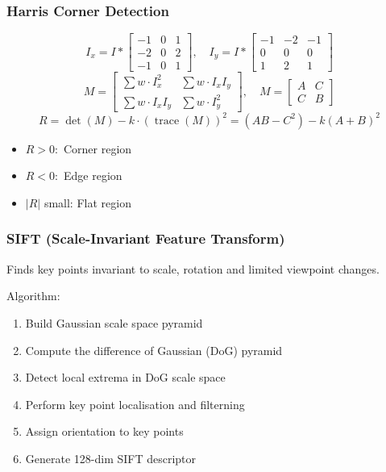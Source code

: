 \subsubsection{Harris Corner Detection}
\[
I_x = I * \begin{bmatrix}
-1 & 0 & 1 \\
-2 & 0 & 2 \\
-1 & 0 & 1
\end{bmatrix}, \quad
I_y = I * \begin{bmatrix}
-1 & -2 & -1 \\
0 & 0 & 0 \\
1 & 2 & 1
\end{bmatrix}
\]
\[
M = \begin{bmatrix}
\sum w \cdot I_x^2 & \sum w \cdot I_x I_y \\
\sum w \cdot I_x I_y & \sum w \cdot I_y^2
\end{bmatrix}, \quad
M = \begin{bmatrix}
A & C \\
C & B
\end{bmatrix}
\]
\[
R = \det(M) - k \cdot (\operatorname{trace}(M))^2 = (AB - C^2) - k(A + B)^2
\]
\begin{itemize}
    \item \(R > 0:\) Corner region
    \item \(R < 0:\) Edge region
    \item \(|R|\) small: Flat region
\end{itemize}

\subsubsection{SIFT (Scale-Invariant Feature Transform)}
Finds key points invariant to scale, rotation and limited viewpoint changes.

Algorithm:
\begin{enumerate}
    \item Build Gaussian scale space pyramid
    \item Compute the difference of Gaussian (DoG) pyramid
    \item Detect local extrema in DoG scale space
    \item Perform key point localisation and filterning 
    \item Assign orientation to key points
    \item Generate 128-dim SIFT descriptor
\end{enumerate}

